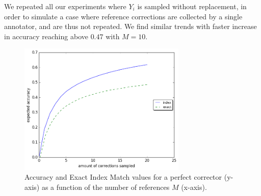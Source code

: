 \documentclass[letterpaper, 11pt]{article}
\begin{document}
We repeated all our experiments where $Y_i$ is sampled without replacement,
in order to simulate a case where reference corrections are collected by a single
annotator, and are thus not repeated. We find similar trends with faster increase
in accuracy reaching above $0.47$ with $M=10$.

%
%
%
%

\begin{figure}
	\vspace{-1em}
  \includegraphics[width=8cm]{noSig_repeat_1000_accuracy}
  \caption{Accuracy and Exact Index Match values for a perfect corrector (y-axis)
    as a function of the number of references $M$ (x-axis).
  } \label{fig:accuracy_vals}
  \vspace{-0.5cm}
\end{figure}
\end{document}
